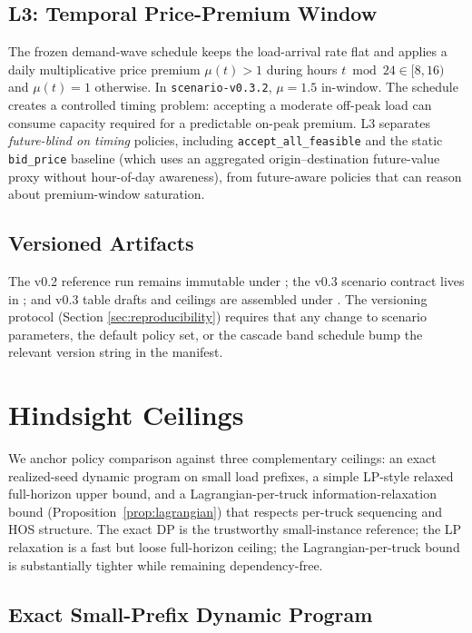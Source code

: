 \documentclass[11pt]{article}
\begin{document}
\subsection{L3: Temporal Price-Premium Window}

The frozen demand-wave schedule keeps the load-arrival rate flat and
applies a daily multiplicative price premium $\mu(t) > 1$ during hours
$t \bmod 24 \in [8, 16)$ and $\mu(t) = 1$ otherwise. In
\texttt{scenario-v0.3.2}, $\mu = 1.5$ in-window. The schedule creates a
controlled timing problem: accepting a moderate off-peak load can consume
capacity required for a predictable on-peak premium. L3 separates
\emph{future-blind on timing} policies, including
\texttt{accept\_all\_feasible} and the static
\texttt{bid\_price} baseline (which uses an aggregated origin--destination
future-value proxy without hour-of-day awareness), from future-aware
policies that can reason about premium-window saturation.

\subsection{Versioned Artifacts}

The v0.2 reference run remains immutable under
; the v0.3 scenario contract lives in
; and v0.3 table drafts
and ceilings are assembled under . The
versioning protocol (Section \ref{sec:reproducibility}) requires that any
change to scenario parameters, the default policy set, or the cascade
band schedule bump the relevant version string in the manifest.

\section{Hindsight Ceilings}
\label{sec:hindsight}

We anchor policy comparison against three complementary ceilings: an
exact realized-seed dynamic program on small load prefixes, a simple
LP-style relaxed full-horizon upper bound, and a Lagrangian-per-truck
information-relaxation bound (Proposition~\ref{prop:lagrangian}) that
respects per-truck sequencing and HOS structure. The exact DP is the
trustworthy small-instance reference; the LP relaxation is a fast but
loose full-horizon ceiling; the Lagrangian-per-truck bound is
substantially tighter while remaining dependency-free.

\subsection{Exact Small-Prefix Dynamic Program}
\end{document}
